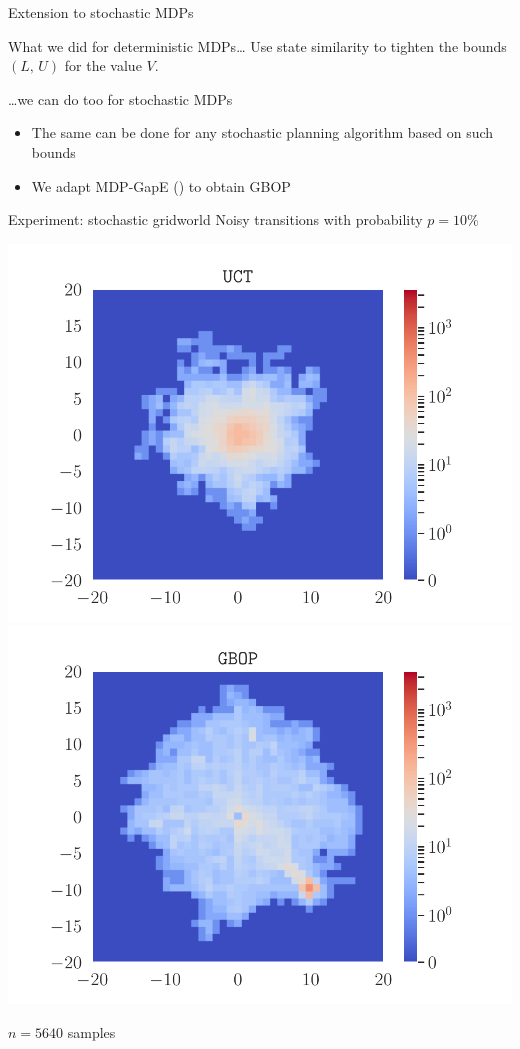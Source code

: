 \documentclass[slideopt,A4,showboxes,svgnames]{beamer}
\begin{document}
\begin{frame}{Extension to stochastic MDPs}
\begin{alertblock}{What we did for deterministic MDPs\dots}
Use state similarity to \alert{tighten} the bounds $(L,\,U)$ for the value $V$.
\end{alertblock}
\pause
\begin{exampleblock}{\dots we can do too for stochastic MDPs}
\begin{itemize}
	\item The same can be done for any stochastic planning algorithm based on such bounds
	\item We adapt MDP-GapE (\cite{Jonsson2020planning}) to obtain GBOP
\end{itemize}
\end{exampleblock}
\end{frame}


\begin{frame}{Experiment: stochastic gridworld}
Noisy transitions with probability $p=10\%$
\begin{center}
	\includegraphics[trim={1.8cm 0.4cm 1.8cm 0.7cm}, clip, width=0.43\linewidth]{../img/occupations_UCT.pdf}
	\includegraphics[trim={1.8cm 0.4cm 1.8cm 0.7cm}, clip, width=0.43\linewidth]{../img/occupations_GBOP.pdf}
	
	$n = 5640$ samples
\end{center}
\end{frame}
\end{document}
